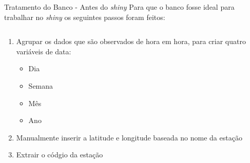 \documentclass[aspectratio=1610]{beamer}
\begin{document}
\begin{frame}{Tratamento do Banco - Antes do \textit{shiny}}
    Para que o banco fosse ideal para trabalhar no \textit{shiny} os seguintes passos foram feitos:
    \pause
    \begin{columns}    
        \begin{column}{0.5\textwidth}
            \begin{enumerate}
                \item Agrupar os dados que são observados de hora em hora, para criar quatro variáveis de data:
                \begin{itemize}
                    \item Dia
                    \item Semana
                    \item Mês
                    \item Ano
                \end{itemize}
                \pause
                \item Manualmente inserir a latitude e longitude baseada no nome da estação
                \pause
                \item Extrair o códgio da estação
            \end{enumerate}
        \end{column}
        \begin{column}{0.5\textwidth}
            \begin{tcolorbox}[title=dplyr \& shiny \& func. base,colback=wcprimary10,colbacktitle=wcprimary,colframe=white,fontlower=\small]
            \end{tcolorbox}
        \end{column}
    \end{columns}
\end{frame}
\end{document}
